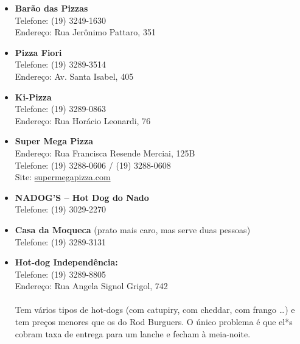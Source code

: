 \begin{itemize}
    \item   \textbf{Barão das Pizzas}
        \\Telefone: (19) 3249-1630
        \\Endereço: Rua Jerônimo Pattaro, 351

    \item   \textbf{Pizza Fiori}
        \\Telefone: (19) 3289-3514
        \\Endereço: Av. Santa Isabel, 405

    \item   \textbf{Ki-Pizza}
        \\Telefone: (19) 3289-0863
        \\Endereço: Rua Horácio Leonardi, 76

    \item   \textbf{Super Mega Pizza}
        \\Endereço: Rua Francisca Resende Merciai, 125B
        \\Telefone: (19) 3288-0606 / (19) 3288-0608
        \\Site: \url{supermegapizza.com}

    \item   \textbf{NADOG'S -- Hot Dog do Nado}
        \\Telefone: (19) 3029-2270

    \item   \textbf{Casa da Moqueca} (prato mais caro, mas serve duas pessoas)
        \\Telefone: (19) 3289-3131
    


    \item   \textbf{Hot-dog Independência:}
        \\Telefone: (19) 3289-8805
        \\Endereço: Rua Angela Signol Grigol, 742
        \\\\
        Tem vários tipos de hot-dogs (com catupiry, com cheddar, com frango
        {\dots}) e tem preços menores que os do Rod Burguers. O único problema é
        que el*s cobram taxa de entrega para um lanche e fecham à meia-noite.


\end{itemize}
